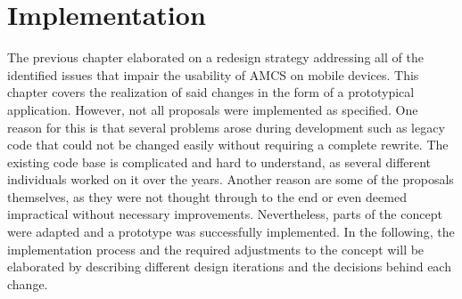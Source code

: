 \chapter{Implementation}
\label{chapter:implementation}

The previous chapter elaborated on a redesign strategy addressing all of the identified issues that impair the usability of AMCS on mobile devices.
This chapter covers the realization of said changes in the form of a prototypical application. However, not all proposals were implemented as specified. One reason for this is that several problems arose during development such as legacy code that could not be changed easily without requiring a complete rewrite. The existing code base is complicated and hard to understand, as several different individuals worked on it over the years. Another reason are some of the proposals themselves, as they were not thought through to the end or even deemed impractical without necessary improvements. Nevertheless, parts of the concept were adapted and a prototype was successfully implemented.
In the following, the implementation process and the required adjustments to the concept will be elaborated by describing different design iterations and the decisions behind each change.

